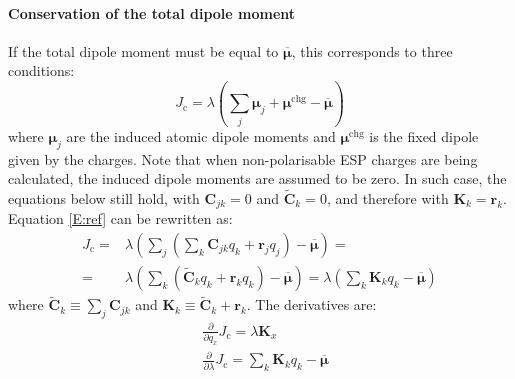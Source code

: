 \documentclass[a4paper]{report}
\newcommand{\bs}{\boldsymbol}
\newcommand{\mr}{\mathrm}
\begin{document}
\paragraph{Conservation of the total dipole moment}

If the total dipole moment must be equal to $\overline{\bs{\mu}}$, this corresponds
to three conditions:
\begin{equation}
J_\mr{c} = \lambda \left(\sum_j \bs{\mu}_j + \bs{\mu}^\mr{chg} - \overline{\bs{\mu}}
\right) 
\label{E:ref}
\end{equation}
where $\bs{\mu}_j$ are the induced atomic dipole moments and $\bs{\mu}^\mr{chg}$ is the
fixed dipole given by the charges. Note that when non-polarisable ESP charges are
being calculated, the induced dipole moments are assumed to be zero. In such case,
the equations below still hold, with $\bs{C}_{jk} = 0$ and $\tilde{\bs{C}}_k = 0$,
and therefore with $\bs{K}_k = \bs{r}_k$. Equation \ref{E:ref} can be rewritten as:
\begin{align}
J_\mr{c} =& \lambda \left(\sum_j \left(\sum_k \bs{C}_{jk} q_k + 
\bs{r}_j q_j\right) - \overline{\bs{\mu}} \right) = \nonumber \\
=& \lambda \left(\sum_k \left( \tilde{\bs{C}}_k q_k + \bs{r}_k q_k \right)-
\overline{\bs{\mu}} \right) = \lambda \left(\sum_k \bs{K}_k q_k -
\overline{\bs{\mu}} \right)
\end{align}
where $\tilde{\bs{C}}_k \equiv \sum_j \bs{C}_{jk}$ and $\bs{K}_k \equiv
\tilde{\bs{C}}_k + \bs{r}_k$. The derivatives are:
\begin{align}
&\frac{\partial}{\partial q_x} J_\mr{c} = \lambda \bs{K}_x \\
&\frac{\partial}{\partial \lambda} J_\mr{c} = \sum_k \bs{K}_k q_k -
\overline{\bs{\mu}}
\end{align}
\end{document}
